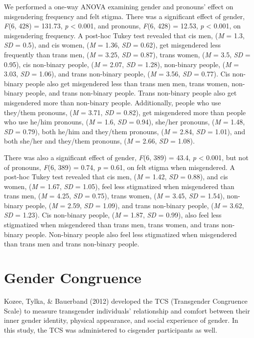 \documentclass[12pt,twoside]{reedthesis}
\begin{document}
We performed a one-way ANOVA examining gender and pronouns' effect on misgendering frequency and felt stigma. There was a significant effect of gender, \emph{F}(6, 428) = 131.73, \emph{p} \textless{} 0.001, and pronouns, \emph{F}(6, 428) = 12.53, \emph{p} \textless{} 0.001, on misgendering frequency. A post-hoc Tukey test revealed that cis men, (\emph{M} = 1.3, \emph{SD} = 0.5), and cis women, (\emph{M} = 1.36, \emph{SD} = 0.62), get misgendered less frequently than trans men, (\emph{M} = 3.25, \emph{SD} = 0.87), trans women, (\emph{M} = 3.5, \emph{SD} = 0.95), cis non-binary people, (\emph{M} = 2.07, \emph{SD} = 1.28), non-binary people, (\emph{M} = 3.03, \emph{SD} = 1.06), and trans non-binary people, (\emph{M} = 3.56, \emph{SD} = 0.77). Cis non-binary people also get misgendered less than trans men men, trans women, non-binary people, and trans non-binary people. Trans non-binary people also get misgendered more than non-binary people. Additionally, people who use they/them pronouns, (\emph{M} = 3.71, \emph{SD} = 0.82), get misgendered more than people who use he/him pronouns, (\emph{M} = 1.6, \emph{SD} = 0.94), she/her pronouns, (\emph{M} = 1.48, \emph{SD} = 0.79), both he/him and they/them pronouns, (\emph{M} = 2.84, \emph{SD} = 1.01), and both she/her and they/them pronouns, (\emph{M} = 2.66, \emph{SD} = 1.08).

There was also a significant effect of gender, \emph{F}(6, 389) = 43.4, \emph{p} \textless{} 0.001, but not of pronouns, \emph{F}(6, 389) = 0.74, \emph{p} = 0.61, on felt stigma when misgendered. A post-hoc Tukey test revealed that cis men, (\emph{M} = 1.42, \emph{SD} = 0.88), and cis women, (\emph{M} = 1.67, \emph{SD} = 1.05), feel less stigmatized when misgendered than trans men, (\emph{M} = 4.25, \emph{SD} = 0.75), trans women, (\emph{M} = 3.45, \emph{SD} = 1.54), non-binary people, (\emph{M} = 2.59, \emph{SD} = 1.09), and trans non-binary people, (\emph{M} = 3.62, \emph{SD} = 1.23). Cis non-binary people, (\emph{M} = 1.87, \emph{SD} = 0.99), also feel less stigmatized when misgendered than trans men, trans women, and trans non-binary people. Non-binary people also feel less stigmatized when misgendered than trans men and trans non-binary people.

\hypertarget{gender-congruence}{%
\section{Gender Congruence}\label{gender-congruence}}

Kozee, Tylka, \& Bauerband (2012) developed the TCS (Transgender Congruence Scale) to measure transgender individuals' relationship and comfort between their inner gender identity, physical appearance, and social experience of gender. In this study, the TCS was administered to cisgender participants as well.
\end{document}
